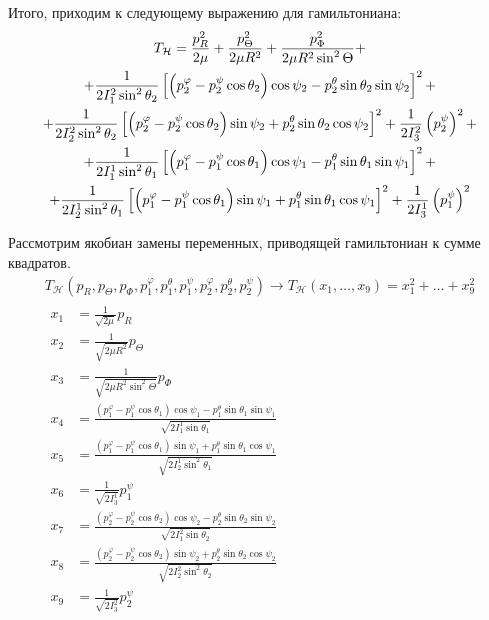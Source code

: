 \documentclass[14pt]{extarticle}
\newcommand{\If}{I_1^2}
\newcommand{\Is}{I_2^2}
\newcommand{\It}{I_3^2}
\newcommand{\Iff}{I_1^1}
\newcommand{\Iss}{I_2^1}
\newcommand{\Itt}{I_3^1}
\newcommand{\lb}{\left(}
\newcommand{\rb}{\right)}
\newcommand{\lsq}{\left[}
\newcommand{\rsq}{\right]}
\newcommand{\mH}{\mathcal{H}}
\begin{document}
Итого, приходим к следующему выражению для гамильтониана:
\begin{gather}
	T_\mathcal{H} = \frac{p_R^2}{2 \mu} + \frac{p_\Theta^2}{2 \mu R^2} + \frac{p_\Phi^2}{2 \mu R^2 \sin^2 \Theta} + \notag \\
	+ \frac{1}{2 \If \sin^2 \theta_2} \lsq \lb p_2^\varphi - p_2^\psi \cos \theta_2 \rb \cos \psi_2 - p_2^\theta \sin \theta_2 \sin \psi_2 \rsq^2 + \notag \\
	+ \frac{1}{2 \Is \sin^2 \theta_2} \lsq \lb p_2^\varphi - p_2^\psi \cos \theta_2 \rb \sin \psi_2 + p_2^\theta \sin \theta_2 \cos \psi_2 \rsq^2 + \frac{1}{2 \It} \lb p_2^\psi \rb^2 + \notag \\
	+ \frac{1}{2 \Iff \sin^2 \theta_1} \lsq \lb p_1^\varphi - p_1^\psi \cos \theta_1 \rb \cos \psi_1 - p_1^\theta \sin \theta_1 \sin \psi_1 \rsq^2 + \notag \\
	+ \frac{1}{2 \Iss \sin^2 \theta_1} \lsq \lb p_1^\varphi - p_1^\psi \cos \theta_1 \rb \sin \psi_1 + p_1^\theta \sin \theta_1 \cos \psi_1 \rsq^2 + \frac{1}{2 \Itt} \lb p_1^\psi \rb^2 \notag
\end{gather}

Рассмотрим якобиан замены переменных, приводящей гамильтониан к сумме квадратов. 
\begin{gather}
	T_\mH(p_R, p_\Theta, p_\Phi, p_1^\varphi, p_1^\theta, p_1^\psi, p_2^\varphi, p_2^\theta, p_2^\psi) \longrightarrow T_\mH(x_1, \dots, x_9) = x_1^2 + \dots + x_9^2 \\
	\begin{aligned}
		x_1 &= \frac{1}{\sqrt{2 \mu}} p_R \\
		x_2 &= \frac{1}{\sqrt{2 \mu R^2}} p_\Theta \\
		x_3 &= \frac{1}{\sqrt{2 \mu R^2 \sin^2 \Theta}} p_\Phi \\
		x_4 &= \frac{(p_1^\varphi - p_1^\psi \cos \theta_1) \cos \psi_1 - p_1^\theta \sin \theta_1 \sin \psi_1}{\sqrt{2 I_1^1 \sin \theta_1}} \\
		x_5 &= \frac{(p_1^\varphi - p_1^\psi \cos \theta_1) \sin \psi_1 + p_1^\theta \sin \theta_1 \cos \psi_1}{\sqrt{2 I_2^1 \sin^2 \theta_1}} \\
		x_6 &= \frac{1}{\sqrt{2 I_3^1}} p_1^\psi \\
		x_7 &= \frac{(p_2^\varphi - p_2^\psi \cos \theta_2) \cos \psi_2 - p_2^\theta \sin \theta_2 \sin \psi_2}{\sqrt{2 I_1^2 \sin \theta_2}} \\
		x_8 &= \frac{(p_2^\varphi - p_2^\psi \cos \theta_2) \sin \psi_2 + p_2^\theta \sin \theta_2 \cos \psi_2}{\sqrt{2 I_2^2 \sin^2 \theta_2}} \\
		x_9 &= \frac{1}{\sqrt{2 I_3^2}} p_2^\psi
	\end{aligned} 
\end{gather}
\end{document}
